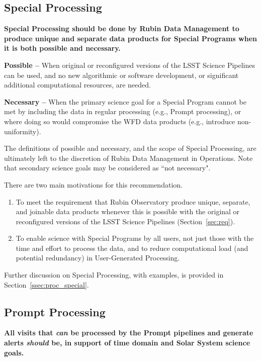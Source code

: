 \subsection{Special Processing}\label{ssec:sci_sproc}

\textbf{Special Processing should be done by Rubin Data Management to 
produce unique and separate data products
for Special Programs when it is both possible and necessary.}

\textbf{Possible -- } When original or reconfigured versions of the LSST
Science Pipelines can be used, and no new algorithmic or software development,
or significant additional computational resources, are needed.

\textbf{Necessary -- } When the primary science goal for a Special Program 
cannot be met by including the data in regular processing (e.g., Prompt processing),
or where doing so would compromise the WFD data products (e.g., introduce non-uniformity).

The definitions of possible and necessary, and the scope of Special Processing,
are ultimately left to the discretion of Rubin Data Management in Operations.
Note that secondary science goals may be considered as ``not necessary".

There are two main motivations for this recommendation.

\begin{enumerate}

\item To meet the requirement that Rubin Observatory produce
unique, separate, and joinable data products whenever this is possible 
with the original or reconfigured versions of the LSST Science Pipelines
(Section~\ref{sec:req}).

\item To enable science with Special Programs by all users, not just those
with the time and effort to process the data, and to reduce computational
load (and potential redundancy) in User-Generated Processing.

\end{enumerate}

Further discussion on Special Processing, with examples, is provided in Section~\ref{ssec:proc_special}.

\subsection{Prompt Processing}\label{ssec:sci_pproc}

\textbf{All visits that \emph{can} be processed by the Prompt pipelines and generate 
alerts \emph{should} be, in support of time domain and Solar System science goals.}

